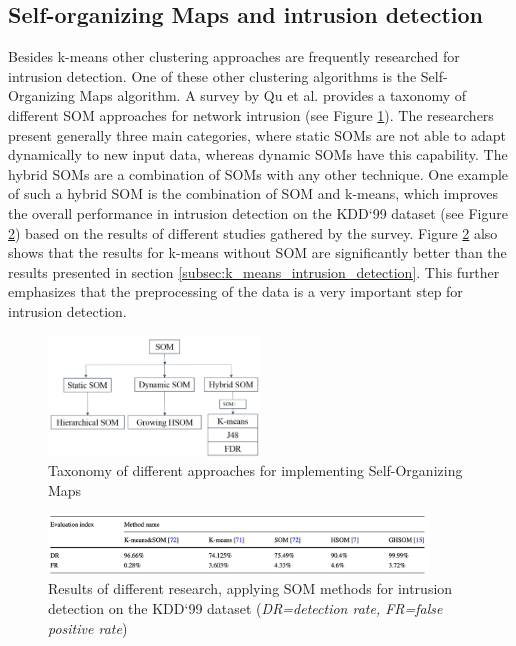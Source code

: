 \documentclass[
    fontsize=12pt,
    headings=small,
    parskip=half,           %
    bibliography=totoc,
    numbers=noenddot,       %
    open=any,               %
    ]{scrreprt}
\begin{document}
\subsection{Self-organizing Maps and intrusion detection}
Besides k-means other clustering approaches are frequently researched for intrusion detection. One of these other clustering algorithms is the Self-Organizing Maps algorithm. A survey by Qu et al. \cite{qu2021survey} provides a taxonomy of different SOM approaches for network intrusion (see Figure \ref{fig:som_taxonomy}). The researchers present generally three main categories, where static SOMs are not able to adapt dynamically to new input data, whereas dynamic SOMs have this capability. The hybrid SOMs are a combination of SOMs with any other technique. One example of such a hybrid SOM is the combination of SOM and k-means, which improves the overall performance in intrusion detection on the KDD`99 dataset (see Figure \ref{fig:som_kmeans}) based on the results of different studies gathered by the survey. Figure \ref{fig:som_kmeans} also shows that the results for k-means without SOM are significantly better than the results presented in section \ref{subsec:k_means_intrusion_detection}. This further emphasizes that the preprocessing of the data is a very important step for intrusion detection.

\begin{figure}[H]
	\sffamily\footnotesize
	\includegraphics[width=0.5\textwidth]{pic/som_taxonomy.png}
	\unitlength=0.5mm
	\linethickness{0.4pt}
	\caption{Taxonomy of different approaches for implementing Self-Organizing Maps \cite{qu2021survey}}
	\label{fig:som_taxonomy}
\end{figure}

\begin{figure}[H]
	\sffamily\footnotesize
	\includegraphics[width=0.9\textwidth]{pic/som_kmeans.png}
	\unitlength=0.5mm
	\linethickness{0.4pt}
	\caption{Results of different research, applying SOM methods for intrusion detection on the KDD`99 dataset (\emph{DR=detection rate, FR=false positive rate}) \cite{qu2021survey}}
	\label{fig:som_kmeans}
\end{figure}
\end{document}
